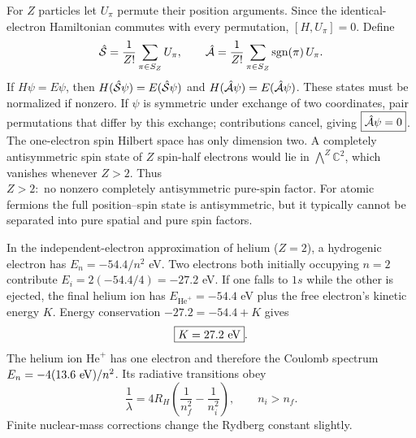 For $Z$ particles let $U_\pi$ permute their
position arguments. Since the identical-electron
Hamiltonian commutes with every permutation,
$[H,U_\pi]=0$. Define
\begin{equation}
\hat{\mathcal S}=\frac1{Z!}\sum_{\pi\in S_Z}U_\pi,
\qquad
\hat{\mathcal A}=\frac1{Z!}\sum_{\pi\in S_Z}
\operatorname{sgn}(\pi)\,U_\pi.
\end{equation}
If $H\psi=E\psi$, then
$H(\hat{\mathcal S}\psi)=E(\hat{\mathcal S}\psi)$ and
$H(\hat{\mathcal A}\psi)=E(\hat{\mathcal A}\psi)$.
These states must be normalized
if nonzero. If $\psi$ is symmetric
under exchange of two coordinates,
pair permutations that differ by this
exchange; contributions cancel,
giving $\boxed{\hat{\mathcal A}\psi=0}$.
The one-electron spin Hilbert space
has only dimension two.
A completely antisymmetric spin state
of $Z$ spin-half electrons would lie
in $\bigwedge^Z\mathbb C^2$, which
vanishes whenever $Z>2$.
Thus $\boxed{Z>2:\text{ no nonzero
completely antisymmetric pure-spin factor}}$.
For atomic fermions the full position--spin
state is antisymmetric, but it typically
cannot be separated into pure spatial and
pure spin factors.

In the independent-electron approximation
of helium ($Z=2$), a hydrogenic electron
has $E_n=-54.4/n^2$ eV.
Two electrons both initially occupying
$n=2$ contribute
$E_i=2(-54.4/4)=-27.2$ eV.
If one falls to $1s$ while the other
is ejected, the final helium ion has
$E_{\mathrm{He}^+}=-54.4$ eV plus the
free electron's kinetic energy $K$.
Energy conservation
$-27.2=-54.4+K$ gives
\begin{equation}
\boxed{K=27.2\ {\rm eV}}.
\end{equation}
The helium ion $\mathrm{He}^+$ has one
electron and therefore the Coulomb
spectrum $E_n=-4(13.6\ {\rm eV})/n^2$.
Its radiative transitions obey
\begin{equation}
\boxed{\frac1\lambda=
4R_H\left(\frac1{n_f^2}-\frac1{n_i^2}\right),
\qquad n_i>n_f}.
\end{equation}
Finite nuclear-mass corrections change
the Rydberg constant slightly.

